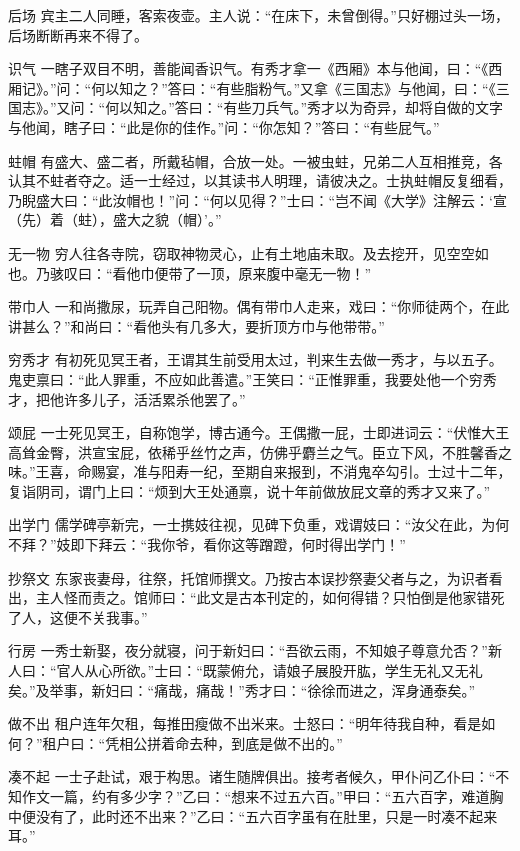 \documentclass[12pt,UTF8]{ctexbook}
\begin{document}
后场
宾主二人同睡，客索夜壶。主人说：“在床下，未曾倒得。”只好棚过头一场，后场断断再来不得了。

识气
一瞎子双目不明，善能闻香识气。有秀才拿一《西厢》本与他闻，曰：“《西厢记》。”问：“何以知之？”答曰：“有些脂粉气。”又拿《三国志》与他闻，曰：“《三国志》。”又问：“何以知之。”答曰：“有些刀兵气。”秀才以为奇异，却将自做的文字与他闻，瞎子曰：“此是你的佳作。”问：“你怎知？”答曰：“有些屁气。”

蛀帽
有盛大、盛二者，所戴毡帽，合放一处。一被虫蛀，兄弟二人互相推竞，各认其不蛀者夺之。适一士经过，以其读书人明理，请彼决之。士执蛀帽反复细看，乃睨盛大曰：“此汝帽也！”问：“何以见得？”士曰：“岂不闻《大学》注解云：‘宣（先）着（蛀），盛大之貌（帽）’。”

无一物
穷人往各寺院，窃取神物灵心，止有土地庙未取。及去挖开，见空空如也。乃骇叹曰：“看他巾便带了一顶，原来腹中毫无一物！”

带巾人
一和尚撒尿，玩弄自己阳物。偶有带巾人走来，戏曰：“你师徒两个，在此讲甚么？”和尚曰：“看他头有几多大，要折顶方巾与他带带。”

穷秀才
有初死见冥王者，王谓其生前受用太过，判来生去做一秀才，与以五子。鬼吏禀曰：“此人罪重，不应如此善遣。”王笑曰：“正惟罪重，我要处他一个穷秀才，把他许多儿子，活活累杀他罢了。”

颂屁
一士死见冥王，自称饱学，博古通今。王偶撒一屁，士即进词云：“伏惟大王高耸金臀，洪宣宝屁，依稀乎丝竹之声，仿佛乎麝兰之气。臣立下风，不胜馨香之味。”王喜，命赐宴，准与阳寿一纪，至期自来报到，不消鬼卒勾引。士过十二年，复诣阴司，谓门上曰：“烦到大王处通禀，说十年前做放屁文章的秀才又来了。”

出学门
儒学碑亭新完，一士携妓往视，见碑下负重，戏谓妓曰：“汝父在此，为何不拜？”妓即下拜云：“我你爷，看你这等蹭蹬，何时得出学门！”

抄祭文
东家丧妻母，往祭，托馆师撰文。乃按古本误抄祭妻父者与之，为识者看出，主人怪而责之。馆师曰：“此文是古本刊定的，如何得错？只怕倒是他家错死了人，这便不关我事。”

行房
一秀士新娶，夜分就寝，问于新妇曰：“吾欲云雨，不知娘子尊意允否？”新人曰：“官人从心所欲。”士曰：“既蒙俯允，请娘子展股开肱，学生无礼又无礼矣。”及举事，新妇曰：“痛哉，痛哉！”秀才曰：“徐徐而进之，浑身通泰矣。”

做不出
租户连年欠租，每推田瘦做不出米来。士怒曰：“明年待我自种，看是如何？”租户曰：“凭相公拼着命去种，到底是做不出的。”

凑不起
一士子赴试，艰于构思。诸生随牌俱出。接考者候久，甲仆问乙仆曰：“不知作文一篇，约有多少字？”乙曰：“想来不过五六百。”甲曰：“五六百字，难道胸中便没有了，此时还不出来？”乙曰：“五六百字虽有在肚里，只是一时凑不起来耳。”
\end{document}
